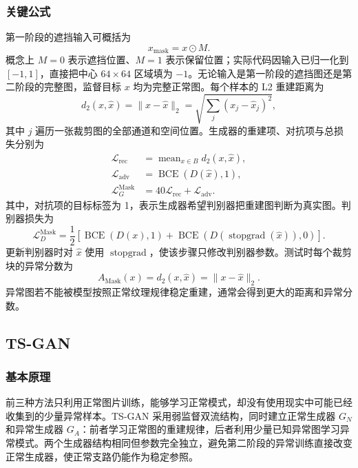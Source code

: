 \documentclass[UTF8,12pt]{ctexart}
\begin{document}
\subsubsection{关键公式}

第一阶段的遮挡输入可概括为
\begin{equation}
x_{\mathrm{mask}}=x\odot M.
\end{equation}
概念上 $M=0$ 表示遮挡位置、$M=1$ 表示保留位置；实际代码因输入已归一化到 $[-1,1]$，直接把中心 $64\times64$ 区域填为 $-1$。无论输入是第一阶段的遮挡图还是第二阶段的完整图，监督目标 $x$ 均为完整正常图。每个样本的 L2 重建距离为
\begin{equation}
d_2(x,\hat{x})=\lVert x-\hat{x}\rVert_2
=\sqrt{\sum_j(x_j-\hat{x}_j)^2},
\end{equation}
其中 $j$ 遍历一张裁剪图的全部通道和空间位置。生成器的重建项、对抗项与总损失分别为
\begin{align}
\mathcal{L}_{\mathrm{rec}}&=\operatorname{mean}_{x\in B}d_2(x,\hat{x}),\\
\mathcal{L}_{\mathrm{adv}}&=\operatorname{BCE}(D(\hat{x}),1),\\
\mathcal{L}_{G}^{\mathrm{Mask}}&=40\mathcal{L}_{\mathrm{rec}}+\mathcal{L}_{\mathrm{adv}}.
\end{align}
其中，对抗项的目标标签为 1，表示生成器希望判别器把重建图判断为真实图。判别器损失为
\begin{equation}
\mathcal{L}_{D}^{\mathrm{Mask}}
=\frac{1}{2}\left[
\operatorname{BCE}(D(x),1)
+\operatorname{BCE}(D(\operatorname{stopgrad}(\hat{x})),0)
\right].
\end{equation}
更新判别器时对 $\hat{x}$ 使用 $\operatorname{stopgrad}$，使该步骤只修改判别器参数。测试时每个裁剪块的异常分数为
\begin{equation}
A_{\mathrm{Mask}}(x)=d_2(x,\hat{x})=\lVert x-\hat{x}\rVert_2.
\end{equation}
异常图若不能被模型按照正常纹理规律稳定重建，通常会得到更大的距离和异常分数。

\subsection{TS-GAN}

\subsubsection{基本原理}

前三种方法只利用正常图片训练，能够学习正常模式，却没有使用现实中可能已经收集到的少量异常样本。TS-GAN 采用弱监督双流结构，同时建立正常生成器 $G_N$ 和异常生成器 $G_A$：前者学习正常图的重建规律，后者利用少量已知异常图学习异常模式。两个生成器结构相同但参数完全独立，避免第二阶段的异常训练直接改变正常生成器，使正常支路仍能作为稳定参照。
\end{document}

